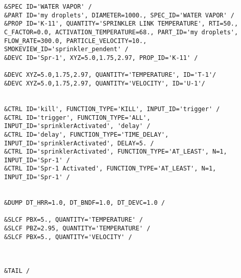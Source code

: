 \begin{lstlisting}[emptylines=0, basicstyle=\tiny]
&SPEC ID='WATER VAPOR' /
&PART ID='my droplets', DIAMETER=1000., SPEC_ID='WATER VAPOR' /
&PROP ID='K-11', QUANTITY='SPRINKLER LINK TEMPERATURE', RTI=50., C_FACTOR=0.0, ACTIVATION_TEMPERATURE=68., PART_ID='my droplets', FLOW_RATE=300.0, PARTICLE_VELOCITY=10., SMOKEVIEW_ID='sprinkler_pendent' /
&DEVC ID='Spr-1', XYZ=5.0,1.75,2.97, PROP_ID='K-11' /

&DEVC XYZ=5.0,1.75,2.97, QUANTITY='TEMPERATURE', ID='T-1'/
&DEVC XYZ=5.0,1.75,2.97, QUANTITY='VELOCITY', ID='U-1'/


&CTRL ID='kill', FUNCTION_TYPE='KILL', INPUT_ID='trigger' /
&CTRL ID='trigger', FUNCTION_TYPE='ALL', INPUT_ID='sprinklerActivated', 'delay' /
&CTRL ID='delay', FUNCTION_TYPE='TIME_DELAY', INPUT_ID='sprinklerActivated', DELAY=5. /
&CTRL ID='sprinklerActivated', FUNCTION_TYPE='AT_LEAST', N=1, INPUT_ID='Spr-1' /
&CTRL ID='Spr-1 Activated', FUNCTION_TYPE='AT_LEAST', N=1, INPUT_ID='Spr-1' /


&DUMP DT_HRR=1.0, DT_BNDF=1.0, DT_DEVC=1.0 /

&SLCF PBX=5., QUANTITY='TEMPERATURE' /
&SLCF PBZ=2.95, QUANTITY='TEMPERATURE' /
&SLCF PBX=5., QUANTITY='VELOCITY' /



&TAIL /
\end{lstlisting}


